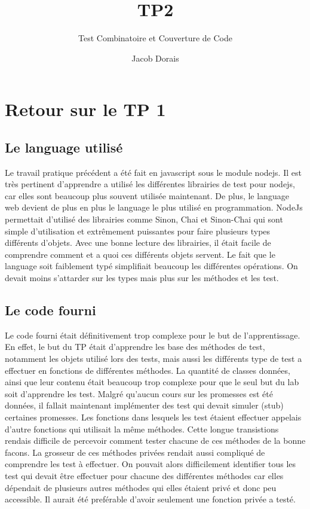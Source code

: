 \documentclass[11pt]{article}
\title{TP2}
\subtitle{Test Combinatoire et Couverture de Code}
\author{Jacob Dorais}{Billy Bouchard}{Gr 02}
\begin{document}
\maketitle
\section{Retour sur le TP 1}
\subsection{Le language utilisé}
Le travail pratique précédent a été fait en javascript sous le module nodejs.
Il est très pertinent d'apprendre a utilisé les différentes librairies de test pour nodejs, car elles sont beaucoup plus souvent utilisée maintenant.
De plus, le language web devient de plus en plus le language le plus utilisé en programmation.
NodeJs permettait d'utilisé des librairies comme Sinon, Chai et Sinon-Chai qui sont simple d'utilisation et extrêmement puissantes pour faire plusieurs types différents d'objets.
Avec une bonne lecture des librairies, il était facile de comprendre comment et a quoi ces différents objets servent.
Le fait que le language soit faiblement typé simplifiait beaucoup les différentes opérations. On devait moins s'attarder sur les types mais plus sur les méthodes et les test.
\subsection{Le code fourni}
Le code fourni était définitivement trop complexe pour le but de l'apprentissage.
En effet, le but du TP était d'apprendre les base des méthodes de test, notamment les objets utilisé lors des tests, mais aussi les différents type de test a effectuer en fonctions de différentes méthodes.
La quantité de classes données, ainsi que leur contenu était beaucoup trop complexe pour que le seul but du lab soit d'apprendre les test.
Malgré qu'aucun cours sur les promesses est été données, il fallait maintenant implémenter des test qui devait simuler (stub) certaines promesses.
Les fonctions dans lesquels les test étaient effectuer appelais d'autre fonctions qui utilisait la même méthodes.
Cette longue transistions rendais difficile de percevoir comment tester chacune de ces méthodes de la bonne facons.
La grosseur de ces méthodes privées rendait aussi compliqué de comprendre les test à effectuer.
On pouvait alors difficilement identifier tous les test qui devait être effectuer pour chacune des différentes méthodes car elles dépendait de plusieurs autres méthodes qui elles étaient privé et donc peu accessible.
Il aurait été preférable d'avoir seulement une fonction privée a testé.
\end{document}
